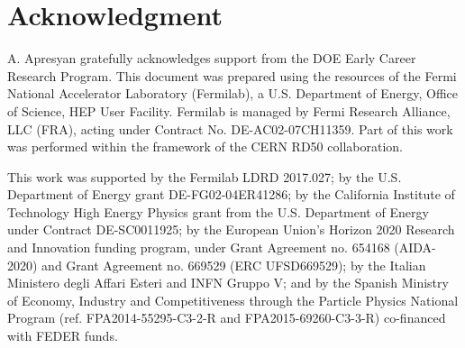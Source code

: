 \documentclass[preprint,1p]{elsarticle}
\begin{document}
\section*{Acknowledgment}

A. Apresyan gratefully acknowledges support from the DOE Early Career Research Program.
This document was prepared using the resources of the Fermi National Accelerator
Laboratory (Fermilab), a U.S. Department of Energy, Office of Science, HEP User
Facility. Fermilab is managed by Fermi Research Alliance, LLC (FRA), acting
under Contract No. DE-AC02-07CH11359. Part of this work was performed within the
framework of the CERN RD50 collaboration.

This work was supported by the Fermilab LDRD 2017.027; by the U.S.
Department of Energy grant DE-FG02-04ER41286; by the California Institute of
Technology High Energy Physics grant from the U.S.
Department of Energy under Contract DE-SC0011925; by the European
Union's Horizon 2020 Research and Innovation funding program, under Grant
Agreement no. 654168 (AIDA-2020) and Grant Agreement no. 669529 (ERC
UFSD669529); by the Italian Ministero degli Affari Esteri and INFN Gruppo V; and
by the Spanish Ministry of Economy, Industry and Competitiveness through the
Particle Physics National Program (ref. FPA2014-55295-C3-2-R and
FPA2015-69260-C3-3-R) co-financed with FEDER funds.








{}





\end{document}
